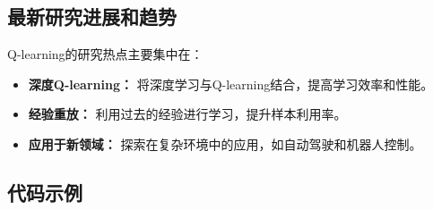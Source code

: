 \subsection*{最新研究进展和趋势}
Q-learning的研究热点主要集中在：
\begin{itemize}
    \item \textbf{深度Q-learning：} 将深度学习与Q-learning结合，提高学习效率和性能。
    \item \textbf{经验重放：} 利用过去的经验进行学习，提升样本利用率。
    \item \textbf{应用于新领域：} 探索在复杂环境中的应用，如自动驾驶和机器人控制。
\end{itemize}
\subsection*{代码示例}
